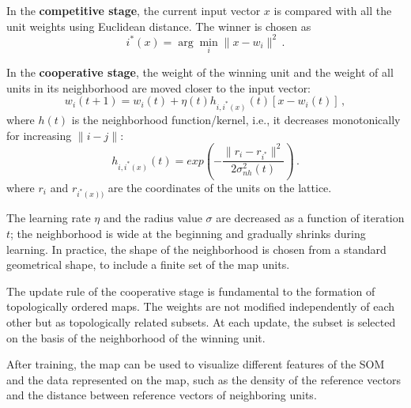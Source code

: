 In the \textbf{competitive stage}, the current input vector $x$ is compared with all the unit weights using Euclidean distance. The winner is chosen as
\begin{equation*}
    i^*(x) = \arg \min_i \|x - w_i\|^2 \,.
\end{equation*}

In the \textbf{cooperative stage}, the weight of the winning unit and the weight of all units in its neighborhood are moved closer to the input vector:
\begin{equation*}
    w_i(t+1) = w_i(t) + \eta (t) h_{i,i^*(x)}(t)[x - w_i(t)] \,,
\end{equation*}
where $h(t)$ is the neighborhood function/kernel, i.e., it decreases monotonically for increasing $\|i-j\|$:
\begin{equation*}
    h_{i,i^*(x)}(t) = exp(-\dfrac{\|r_i - r_{i^*}\|^2}{2 \sigma_{nh}^2 (t)}) \,.
\end{equation*}
where $r_i$ and $r_{i^*(x))}$ are the coordinates of the units on the lattice.

The learning rate $\eta$ and the radius value $\sigma$ are decreased as a function of iteration $t$; the neighborhood is wide at the beginning and gradually shrinks during learning. In practice, the shape of the neighborhood is chosen from a standard geometrical shape, to include a finite set of the map units.

The update rule of the cooperative stage is fundamental to the formation of topologically ordered maps. The weights are not modified independently of each other but as topologically related subsets. At each update, the subset is selected on the basis of the neighborhood of the winning unit.

After training, the map can be used to visualize different features of the SOM and the data represented on the map, such as the density of the reference vectors and the distance between reference vectors of neighboring units.
